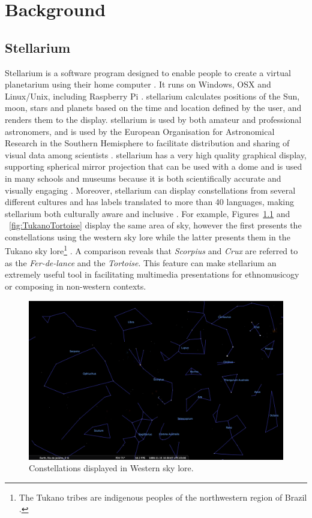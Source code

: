 \chapter{Background}
\section{Stellarium}
Stellarium is a software program designed to enable people to create a virtual planetarium using their home computer \cite{zottistellarium}. It runs on Windows, OSX and Linux/Unix, including Raspberry Pi \cite[p.~6]{zottistellarium}.  stellarium calculates positions of the Sun, moon, stars and planets based on the time and location defined by the user, and renders them to the display.  stellarium is used by both amateur and professional astronomers, and is used by the  European Organisation for Astronomical Research in the Southern Hemisphere to facilitate distribution and sharing of visual data among scientists \cite{berglund2008using}. stellarium has a very high quality graphical display, supporting spherical mirror projection that can be used with a dome \cite{mc2009touring} and is used in many schools and museums because it is both scientifically accurate and visually engaging \cite{berglund2008using}.  Moreover, stellarium can display constellations from several different cultures and has labels translated to more than 40 languages, making stellarium both culturally aware and inclusive \cite{berglund2008using}.
For example,  Figures~\ref{fig:WesternCrux} and ~\ref{fig:TukanoTortoise} display the same area of sky, however the first presents the constellations using the western sky lore while the latter presents them in the Tukano sky lore\footnote{The Tukano tribes are indigenous peoples of the northwestern region of Brazil \cite{KnoblochFrancis1976TTIA}.} \cite{reichel1976cosmology}. A comparison reveals that \textit{Scorpius} and \textit{Crux} are referred to as the \textit{Fer-de-lance} and the \textit{Tortoise}. This feature can make stellarium an extremely useful tool in facilitating multimedia presentations for ethnomusicogy or composing in non-western contexts.

\begin{figure}[htbp]
	\centering
	\includegraphics[width=1\columnwidth]{WesternCrux}
	\caption{Constellations displayed in Western sky lore.}
	\label{fig:WesternCrux}
\end{figure}

